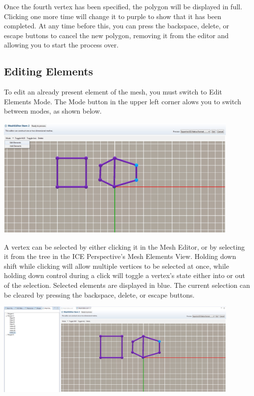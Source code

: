 \documentclass{article}
\begin{document}
Once the fourth vertex has been specified, the polygon will be displayed
in full. Clicking one more time will change it to purple to show that it has
been completed. At any time before this, you can press the backspace, delete,
or escape buttons to cancel the new polygon, removing it from the editor and
allowing you to start the process over.

\subsection{Editing Elements}

To edit an already present element of the mesh, you must switch to Edit Elements
Mode. The Mode button in the upper left corner alows you to switch between
modes, as shown below.

\begin{center}
\includegraphics[width=12cm]{images/MeshEditorEditMode}
\end{center}

A vertex can be selected by either clicking it in the Mesh Editor, or by
selecting it from the tree in the ICE Perspective's Mesh Elements View. Holding
down shift while clicking will allow multiple vertices to be selected at once,
while holding down control during a click will toggle a vertex's state either
into or out of the selection. Selected elements are displayed in blue.
The current selection can be cleared by pressing the backspace, delete, or
escape buttons.

\begin{center}
\includegraphics[width=12cm]{images/MeshEditorSelection}
\end{center}
\end{document}
